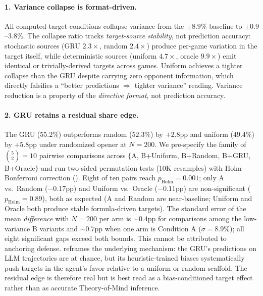 \documentclass[11pt,a4paper]{article}
\begin{document}
\paragraph{1. Variance collapse is format-driven.} All computed-target conditions collapse variance from the $\pm 8.9\%$ baseline to $\pm 0.9$--$3.8\%$. The collapse ratio tracks \emph{target-source stability}, not prediction accuracy: stochastic sources (GRU $2.3\times$, random $2.4\times$) produce per-game variation in the target itself, while deterministic sources (uniform $4.7\times$, oracle $9.9\times$) emit identical or trivially-derived targets across games. Uniform achieves a tighter collapse than the GRU despite carrying zero opponent information, which directly falsifies a ``better predictions $\Rightarrow$ tighter variance'' reading. Variance reduction is a property of the \emph{directive format}, not prediction accuracy.

\paragraph{2. GRU retains a residual share edge.} The GRU ($55.2\%$) outperforms random ($52.3\%$) by $+2.8$pp and uniform ($49.4\%$) by $+5.8$pp under randomized opener at $N = 200$. We pre-specify the family of $\binom{5}{2} = 10$ pairwise comparisons across $\{$A, B+Uniform, B+Random, B+GRU, B+Oracle$\}$ and run two-sided permutation tests (10K resamples) with Holm--Bonferroni correction (). Eight of ten pairs reach $p_\text{Holm} = 0.001$; only A vs.\ Random ($-0.17$pp) and Uniform vs.\ Oracle ($-0.11$pp) are non-significant ($p_\text{Holm} = 0.89$), both as expected (A and Random are near-baseline; Uniform and Oracle both produce stable formula-driven targets). The standard error of the mean \emph{difference} with $N=200$ per arm is ${\sim}0.4$pp for comparisons among the low-variance B variants and ${\sim}0.7$pp when one arm is Condition A ($\sigma\!=\!8.9\%$); all eight significant gaps exceed both bounds. This cannot be attributed to anchoring defense.  reframes the underlying mechanism: the GRU's predictions on LLM trajectories are at chance, but its heuristic-trained biases systematically push targets in the agent's favor relative to a uniform or random scaffold. The residual edge is therefore real but is best read as a bias-conditioned target effect rather than as accurate Theory-of-Mind inference.
\end{document}
